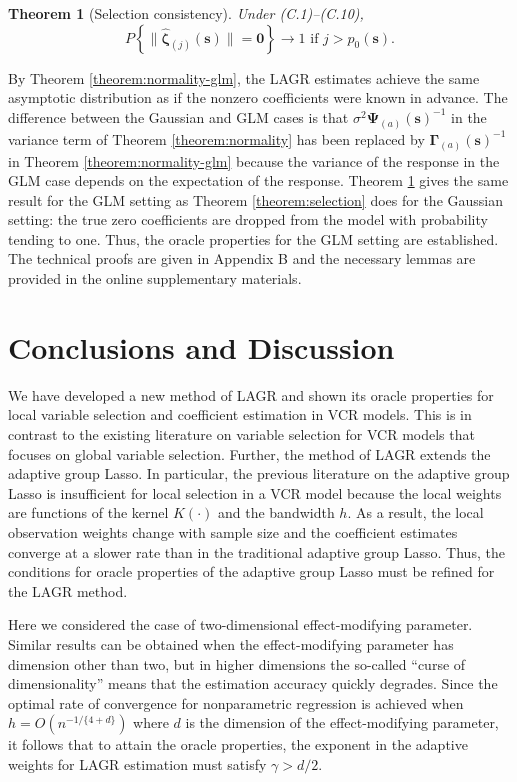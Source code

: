 \documentclass[authoryear,review, 12pt]{elsarticle}
\newtheorem{thm}{Theorem}
\begin{document}
\begin{thm}[Selection consistency]
\label{theorem:selection-glm}  Under (C.1)--(C.10),
\[
P\left\{ \|\hat{\bm{\zeta}}_{(j)}(\bm{s})\|=\bm{0}\right\} \to1\text{ if }j>p_{0}(\bm{s}).
\]
 
\end{thm}
By Theorem \ref{theorem:normality-glm}, the LAGR estimates achieve
the same asymptotic distribution as if the nonzero coefficients were
known in advance. The difference between the Gaussian and GLM cases
is that $\sigma^{2}\bm{\Psi}_{(a)}(\bm{s})^{-1}$ in the variance
term of Theorem \ref{theorem:normality} has been replaced by $\bm{\Gamma}_{(a)}(\bm{s})^{-1}$
in Theorem \ref{theorem:normality-glm} because the variance of the
response in the GLM case depends on the expectation of the response.
Theorem \ref{theorem:selection-glm} gives the same result for the
GLM setting as Theorem \ref{theorem:selection} does for the Gaussian
setting: the true zero coefficients are dropped from the model with
probability tending to one. Thus, the oracle properties for the GLM
setting are established. The technical proofs are given in Appendix
B and the necessary lemmas are provided in the online supplementary
materials.


\section{Conclusions and Discussion \label{section-conclusion}}

We have developed a new method of LAGR and shown its oracle properties
for local variable selection and coefficient estimation in VCR models.
This is in contrast to the existing literature on variable selection
for VCR models that focuses on global variable selection. Further,
the method of LAGR extends the adaptive group Lasso. In particular,
the previous literature on the adaptive group Lasso is insufficient
for local selection in a VCR model because the local weights are functions
of the kernel $K(\cdot)$ and the bandwidth $h$. As a result, the
local observation weights change with sample size and the coefficient
estimates converge at a slower rate than in the traditional adaptive
group Lasso. Thus, the conditions for oracle properties of the adaptive
group Lasso must be refined for the LAGR method.

Here we considered the case of two-dimensional effect-modifying parameter.
Similar results can be obtained when the effect-modifying parameter
has dimension other than two, but in higher dimensions the so-called
``curse of dimensionality'' means that the estimation accuracy quickly
degrades. Since the optimal rate of convergence for nonparametric
regression is achieved when $h=O\left(n^{-1/\{4+d\}}\right)$ where
$d$ is the dimension of the effect-modifying parameter, it follows
that to attain the oracle properties, the exponent in the adaptive
weights for LAGR estimation must satisfy $\gamma>d/2$.
\end{document}
